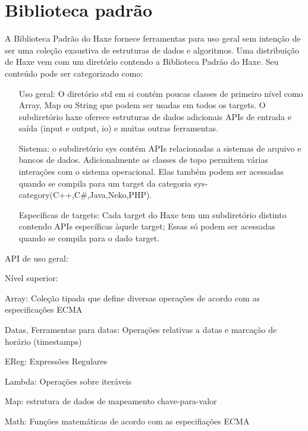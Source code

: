 \chapter{Biblioteca padrão}
\label{std}


A Biblioteca Padrão do Haxe fornece ferramentas para uso geral sem intenção de ser uma coleção exaustiva de estruturas de dados e algoritmos. Uma distribuição de Haxe vem com um diretório  contendo a Biblioteca Padrão do Haxe. Seu conteúdo pode ser categorizado como:

\begin{itemize}
    \item [Uso geral:] O diretório std em si contém poucas classes de primeiro nível como Array, Map ou String que podem ser usadas em todos os targets. O subdiretório haxe oferece estruturas de dados adicionais APIs de entrada e saída (input e output, io) e muitas outras ferramentas.

    \item [Sistema:] o subdiretório sys contém APIs relacionadas a sistemas de arquivo e bancos de dados. Adicionalmente as classes de topo permitem várias interações com o sistema operacional. Elas também podem ser acessadas quando se compila para um target da categoria sys-category(C++,C#,Java,Neko,PHP).

    \item [Específicas de targets:] Cada target do Haxe tem um subdiretório distinto contendo APIs específicas àquele target; Essas só podem ser acessadas quando se compila para o dado target.
\end{itemize}

API de uso geral:

Nível superior:

Array: Coleção tipada que define diversas operações de acordo com as especificações ECMA

Datas, Ferramentas para datas: Operações relativas a datas e marcação de horário (timestamps)

EReg: Expressões Regulares

Lambda: Operações sobre iteráveis

Map: estrutura de dados de mapeamento chave-para-valor

Math: Funções matemáticas de acordo com as especifiações ECMA

